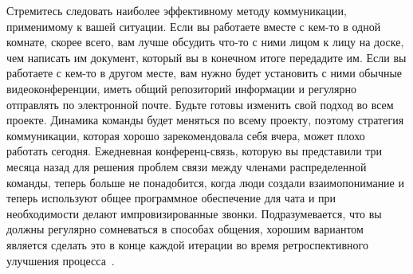 \documentclass{../industrial-development}
\begin{document}
\lecturenotes

Стремитесь следовать наиболее эффективному методу коммуникации, применимому к вашей ситуации. Если вы работаете вместе с кем-то в одной комнате, скорее всего, вам лучше обсудить что-то с ними лицом к лицу на доске, чем написать им документ, который вы в конечном итоге передадите им. Если вы работаете с кем-то в другом месте, вам нужно будет установить с ними обычные видеоконференции, иметь общий репозиторий информации и регулярно отправлять по электронной почте.
Будьте готовы изменить свой подход во всем проекте. Динамика команды будет меняться по всему проекту, поэтому стратегия коммуникации, которая хорошо зарекомендовала себя вчера, может плохо работать сегодня. Ежедневная конференц-связь, которую вы представили три месяца назад для решения проблем связи между членами распределенной команды, теперь больше не понадобится, когда люди создали взаимопонимание и теперь используют общее программное обеспечение для чата и при необходимости делают импровизированные звонки. Подразумевается, что вы должны регулярно сомневаться в способах общения, хорошим вариантом является сделать это в конце каждой итерации во время ретроспективного улучшения процесса~\cite{AgileComm}.


\end{document}
